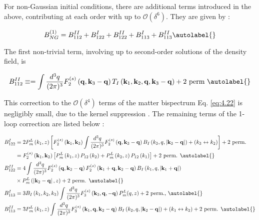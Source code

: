 For non-Gaussian initial conditions, there are additional terms introduced in the above, contributing at each order with up to $\mathcal{O}\left(\delta^{6}\right)$. They are given by \cite{Sefusatti_2009}:


\begin{equation}
    B_{N G}^{(1)}=B_{112}^{I I}+B_{122}^{I}+B_{122}^{I I}+B_{113}^{I}+B_{113}^{I I} \autolabel{}
\end{equation}


The first non-trivial term, involving up to second-order solutions of the density field, is


\begin{equation}
    B_{112}^{I I} \equiv=\int \frac{d^{3} q}{(2 \pi)^{3}} F_{2}^{(s)}\left(\mathbf{q}, \mathbf{k}_{3}-\mathbf{q}\right) T_{I}\left(\mathbf{k}_{1}, \mathbf{k}_{2}, \mathbf{q}, \mathbf{k}_{3}-\mathbf{q}\right)+2 \text { perm } \autolabel{}
\end{equation}


This correction to the $\mathcal{O}\left(\delta^{4}\right)$ terms of the matter bispectrum Eq. \eqref{eq:4.22} is negligibly small, due to the kernel suppression \cite{Scoccimarro_2004}. The remaining terms of the 1-loop correction are listed below \cite{Sefusatti_2009}:


\begin{align*}
    B_{122}^{I} & =2 P_{m}^{L}\left(k_{1}, z\right)\left[F_{2}^{(s)}\left(\mathbf{k}_{1}, \mathbf{k}_{3}\right) \int \frac{d^{3} q}{(2 \pi)^{3}} F_{2}^{(s)}\left(\mathbf{q}, \mathbf{k}_{3}-\mathbf{q}\right) B_{I}\left(k_{3}, q,\left|\mathbf{k}_{3}-\mathbf{q}\right|\right)+\left(k_{3} \leftrightarrow k_{2}\right)\right]+2 \text { perm. } \\
    & =F_{2}^{(s)}\left(\mathbf{k}_{1}, \mathbf{k}_{2}\right)\left[P_{m}^{L}\left(k_{1}, z\right) P_{12}\left(k_{2}\right)+P_{m}^{L}\left(k_{2}, z\right) P_{12}\left(k_{1}\right)\right]+2 \text { perm. }  \autolabel{}\\
    B_{122}^{I I} & =4 \int \frac{d^{3} q}{(2 \pi)^{3}} F_{2}^{(s)}\left(\mathbf{q}, \mathbf{k}_{2}-\mathbf{q}\right) F_{2}^{(s)}\left(\mathbf{k}_{1}+\mathbf{q}, \mathbf{k}_{2}-\mathbf{q}\right) B_{I}\left(k_{1}, q,\left|\mathbf{k}_{1}+\mathbf{q}\right|\right) \\
    & \times P_{m}^{L}\left(\left|\mathbf{k}_{2}-\mathbf{q}\right|, z\right)+2 \text { perm. }  \autolabel{}\\
    B_{113}^{I} & =3 B_{I}\left(k_{1}, k_{2}, k_{3}\right) \int \frac{d^{3} q}{(2 \pi)^{3}} F_{3}^{(s)}\left(\mathbf{k}_{3}, \mathbf{q},-\mathbf{q}\right) P_{m}^{L}(q, z)+2 \text { perm., }  \autolabel{}\\
    B_{113}^{I I} & =3 P_{m}^{L}\left(k_{1}, z\right) \int \frac{d^{3} q}{(2 \pi)^{3}} F_{3}^{(s)}\left(\mathbf{k}_{1}, \mathbf{q}, \mathbf{k}_{2}-\mathbf{q}\right) B_{I}\left(k_{2}, q,\left|\mathbf{k}_{2}-\mathbf{q}\right|\right)+\left(k_{1} \leftrightarrow k_{2}\right)+2 \text { perm. } \autolabel{}
\end{align*}



